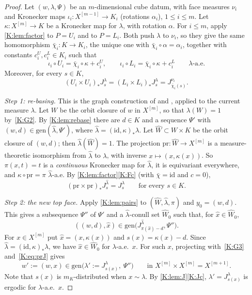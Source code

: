 \begin{proof}
Let $(w,\lambda,\Psi)$ be an $m$-dimensional cube datum, with face measures $\nu_i$ and
Kronecker maps $\iota_i\colon X^{[m-1]}\to K_i$ (rotations $\alpha_i$), $1\le i\le m$.
Let $\kappa\colon X^{[m]}\to K$ be a Kronecker map for $\lambda$, with rotation $\alpha$.
For $i\le m$, apply \cref{K:lem:factor} to $P=U_i$ and to $P=L_i$. Both push $\lambda$ to
$\nu_i$, so they give the same homomorphism $\bar\chi_i\colon K\to K_i$, the unique one with
$\bar\chi_i\circ\alpha=\alpha_i$, together with constants $c_i^U,c_i^L\in K_i$ such that
\begin{equation}\label{K:eq:affine}
\iota_i\circ U_i=\bar\chi_i\circ\kappa+c_i^U,\qquad\iota_i\circ L_i=\bar\chi_i\circ\kappa+c_i^L\qquad\lambda\text{-a.e.}
\end{equation}
Moreover, for every $s\in K$,
\begin{equation}\label{K:eq:facesym}
(U_i\times U_i)_*J^\lambda_s=(L_i\times L_i)_*J^\lambda_s=J^{\nu_i}_{\bar\chi_i(s)} .
\end{equation}

\emph{Step 1: re-basing.}
This is the graph construction of \cite[Proposition~3.20]{kra2022infinite} and
\cite[Proposition~3.7]{charamaras2024finding}, applied to the current measure $\lambda$.
Let $W$ be the orbit closure of $w$ in $X^{[m]}$, so that $\lambda(W)=1$ by~\ref{K:G2}.
By \cref{K:lem:rebase} there are $d\in K$ and a \Fol{} sequence $\Psi'$ with
$(w,d)\in\mathrm{gen}(\hat\lambda,\Psi')$, where $\hat\lambda=(\mathrm{id},\kappa)_*\lambda$.
Let $\widehat W\subset W\times K$ be the orbit closure of $(w,d)$; then $\hat\lambda(\widehat W)=1$.
The projection $\mathrm{pr}\colon\widehat W\to X^{[m]}$ is a measure-theoretic isomorphism
from $\hat\lambda$ to $\lambda$, with inverse $x\mapsto(x,\kappa(x))$.
So $\pi(x,t)=t$ is a \emph{continuous} Kronecker map for $\hat\lambda$, it is equivariant
everywhere, and $\kappa\circ\mathrm{pr}=\pi$ $\hat\lambda$-a.e.
By \cref{K:lem:factor}\ref{K:Fc} (with $\bar\chi=\mathrm{id}$ and $c=0$),
\begin{equation}\label{K:eq:prJ}
(\mathrm{pr}\times\mathrm{pr})_*J^{\hat\lambda}_s=J^\lambda_s\qquad\text{for every }s\in K .
\end{equation}

\emph{Step 2: the new top face.}
Apply \cref{K:lem:pairs} to $(\widehat W,\hat\lambda,\pi)$ and $y_0=(w,d)$.
This gives a subsequence $\Psi''$ of $\Psi'$ and a $\hat\lambda$-conull set $\widehat W_0$
such that, for $\hat x\in\widehat W_0$,
\[
((w,d),\hat x)\in\mathrm{gen}\big(J^{\hat\lambda}_{\pi(\hat x)-d},\Psi''\big).
\]
For $x\in X^{[m]}$ put $\hat x=(x,\kappa(x))$ and $s(x)=\kappa(x)-d$.
Since $\hat\lambda=(\mathrm{id},\kappa)_*\lambda$, we have $\hat x\in\widehat W_0$ for
$\lambda$-a.e.\ $x$.
For such $x$, projecting with~\ref{K:G3} and~\eqref{K:eq:prJ} gives
\begin{equation}\label{K:eq:newgen}
w':=(w,x)\in\mathrm{gen}\big(\lambda':=J^\lambda_{s(x)},\ \Psi''\big)\qquad\text{in }X^{[m]}\times X^{[m]}=X^{[m+1]} .
\end{equation}
Note that $s(x)$ is $m_K$-distributed when $x\sim\lambda$.
By \cref{K:lem:J}\ref{K:Jc}, $\lambda'=J^\lambda_{s(x)}$ is ergodic for $\lambda$-a.e.\ $x$.


\end{proof}

